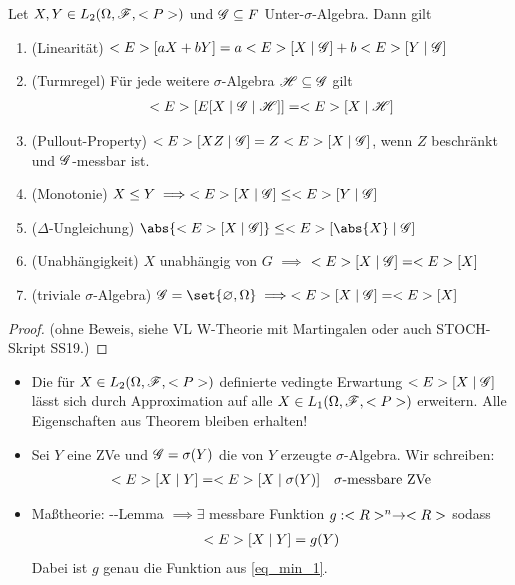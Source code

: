 \begin{theorem} %
	Let $X,Y \in L_2(\Omega,\mathscr F,<P>)$ und $\mathscr{G} \subseteq F$ Unter-$\sigma$-Algebra. Dann gilt
	\begin{enumerate}
		\item (Linearität) $<E>[aX+bY] = a<E>[X\mid \mathscr{G}] + b<E>[Y\mid \mathscr{G}]$
		\item (Turmregel) Für jede weitere $\sigma$-Algebra $\mathscr{H} \subseteq\mathscr{G}$ gilt
		\begin{align*}
			<E>[E[X\mid \mathscr{G} \mid \mathscr{H}]] = <E>[X\mid \mathscr{H}]
		\end{align*}
		\item (Pullout-Property) $<E>[XZ\mid \mathscr{G}] = Z<E>[X\mid \mathscr{G}]$, wenn $Z$ beschränkt und $\mathscr{G}$-messbar ist.
		\item (Monotonie) $X \le Y \implies <E>[X\mid \mathscr{G}] \le <E>[Y \mid \mathscr{G}]$
		\item ($\Delta$-Ungleichung) $\abs{\E[X\mid \G]} \le \E[\abs{X}\mid \G]$
		\item (Unabhängigkeit) $X$ unabhängig von $G$ $\implies$ $<E>[X \mid \mathscr{G}] = <E>[X]$
		\item (triviale $\sigma$-Algebra) $\G=\set{\emptyset, \O} \implies \E[X \mid \G] = \E[X]$ 
	\end{enumerate}
\end{theorem}
\begin{proof}
	(ohne Beweis, siehe VL W-Theorie mit Martingalen oder auch STOCH-Skript SS19.)
\end{proof}
\begin{*remark}
	\begin{itemize}
		\item Die für $X \in L_2(\Omega,\mathscr F,<P>)$ definierte vedingte Erwartung $<E>[X\mid \mathscr{G}]$ lässt sich durch Approximation auf alle $X\in L_1(\Omega,\mathscr F,<P>)$ erweitern. Alle Eigenschaften aus Theorem  bleiben erhalten!
		\item Sei $Y$ eine ZVe und $\mathscr{G} = \sigma(Y)$ die von $Y$ erzeugte $\sigma$-Algebra. Wir schreiben:
		\begin{align*}
		<E>[X\mid Y] = <E>[X \mid \sigma(Y)] \quad \sigma\text{-messbare ZVe}
		\end{align*}
		\item Maßtheorie: --Lemma $\implies \exists$ messbare Funktion $g: <R>^n \to <R>$ sodass
		\begin{align*}
		<E>[X\mid Y] = g(Y)
		\end{align*}
		Dabei ist $g$ genau die Funktion aus \eqref{eq_min_1}.
	\end{itemize}
\end{*remark}
